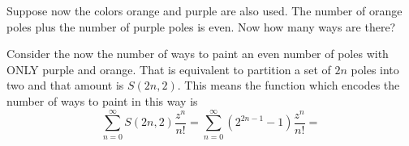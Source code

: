 \documentclass[12pt]{memoir}
\begin{document}
\begin{Ej}[Exercise 7]
    Suppose now the colors orange and purple are also used. The number of
orange poles plus the number of purple poles is even. Now how many ways are there?
\end{Ej}

\begin{ptcbr}
    Consider the now the number of ways to paint an even number of poles with ONLY purple and orange. That is equivalent to partition a set of $2n$ poles into two and that amount is $S(2n,2)$. This means the function which encodes the number of ways to paint in this way is 
    $$\sum_{n=0}^\infty S(2n,2)\frac{z^n}{n!}=\sum_{n=0}^\infty (2^{2n-1}-1)\frac{z^n}{n!}=$$
\end{ptcbr}
\end{document}
